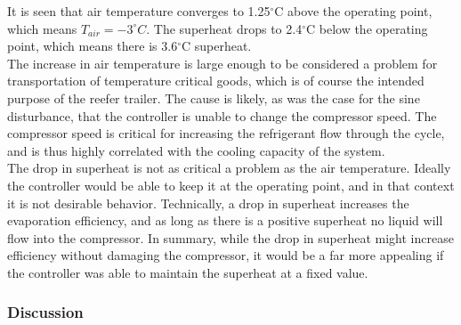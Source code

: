 It is seen that air temperature converges to 1.25$^{\circ}$C above the operating point, which means $T_{air} = -3^{\circ}C$. The superheat drops to 2.4$^{\circ}$C below the operating point, which means there is 3.6$^{\circ}$C superheat.\\

The increase in air temperature is large enough to be considered a problem for transportation of temperature critical goods, which is of course the intended purpose of the reefer trailer. The cause is likely, as was the case for the sine disturbance, that the controller is unable to change the compressor speed. The compressor speed is critical for increasing the refrigerant flow through the cycle, and is thus highly correlated with the cooling capacity of the system. \\

The drop in superheat is not as critical a problem as the air temperature. Ideally the controller would be able to keep it at the operating point, and in that context it is not desirable behavior. Technically, a drop in superheat increases the evaporation efficiency, and as long as there is a positive superheat no liquid will flow into the compressor. In summary, while the drop in superheat might increase efficiency without damaging the compressor, it would be a far more appealing if the controller was able to maintain the superheat at a fixed value.


\subsubsection{Discussion}